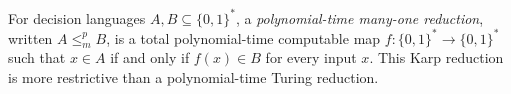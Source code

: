 
For decision languages $A,B\subseteq\{0,1\}^*$, a \emph{polynomial-time many-one reduction}, written $A\le_m^pB$, is a total polynomial-time computable map $f:\{0,1\}^*\to\{0,1\}^*$ such that $x\in A$ if and only if $f(x)\in B$ for every input $x$. This Karp reduction is more restrictive than a polynomial-time Turing reduction.
